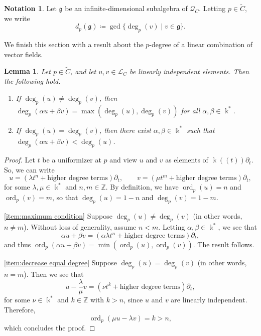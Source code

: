 \documentclass[12pt]{amsart}
\theoremstyle{plain}
\newtheorem{lemma}[theorem]{Lemma}
\theoremstyle{definition}
\newtheorem{notation}[theorem]{Notation}
\numberwithin{equation}{section}
\def\g{\mathfrak{g}}
\def\L{\mathcal{L}}
\def\Q{\mathcal{Q}}
\def\ZZ{\mathbb{Z}}
\def\kk{\Bbbk}
\DeclareMathOperator{\ord}{ord}
\def\del{\partial}
\begin{document}
\begin{notation}
    Let $\g$ be an infinite-dimensional subalgebra of $\Q_C$. Letting $p \in \widetilde{C}$, we write
    $$d_p(\g) \coloneqq \gcd\{\deg_p(v) \mid v \in \g\}.$$
\end{notation}

We finish this section with a result about the $p$-degree of a linear combination of vector fields.

\begin{lemma}\label{lem:properties of deg(g)}
    Let $p \in \widetilde{C}$, and let $u,v \in \L_C$ be linearly independent elements. Then the following hold.
    \begin{enumerate}
        \item If $\deg_p(u) \neq \deg_p(v)$, then $\deg_p(\alpha u + \beta v) = \max(\deg_p(u),\deg_p(v))$ for all $\alpha, \beta \in \kk^*$.\label{item:maximum condition}
        \item If $\deg_p(u) = \deg_p(v)$, then there exist $\alpha,\beta \in \kk^*$ such that $\deg_p(\alpha u + \beta v) < \deg_p(u)$.\label{item:decrease equal degree}
    \end{enumerate}
\end{lemma}
\begin{proof}
    Let $t$ be a uniformizer at $p$ and view $u$ and $v$ as elements of $\kk((t))\del_t$. So, we can write
    $$u = (\lambda t^n + \text{higher degree terms})\del_t, \qquad v = (\mu t^m + \text{higher degree terms})\del_t,$$
    for some $\lambda,\mu \in \kk^*$ and $n,m \in \ZZ$. By definition, we have $\ord_p(u) = n$ and $\ord_p(v) = m$, so that $\deg_p(u) = 1 - n$ and $\deg_p(v) = 1 - m$.

    \eqref{item:maximum condition} Suppose $\deg_p(u) \neq \deg_p(v)$ (in other words, $n \neq m$). Without loss of generality, assume $n < m$. Letting $\alpha, \beta \in \kk^*$, we see that
    $$\alpha u + \beta v = (\alpha \lambda t^n + \text{higher degree terms})\del_t,$$
    and thus $\ord_p(\alpha u + \beta v) = \min(\ord_p(u),\ord_p(v))$. The result follows.

    \eqref{item:decrease equal degree} Suppose $\deg_p(u) = \deg_p(v)$ (in other words, $n = m$). Then we see that
    $$u - \frac{\lambda}{\mu} v = (\nu t^k + \text{higher degree terms})\del_t,$$
    for some $\nu \in \kk^*$ and $k \in \ZZ$ with $k > n$, since $u$ and $v$ are linearly independent. Therefore,
    $$\ord_p(\mu u - \lambda v) = k > n,$$
    which concludes the proof.
\end{proof}
\end{document}
